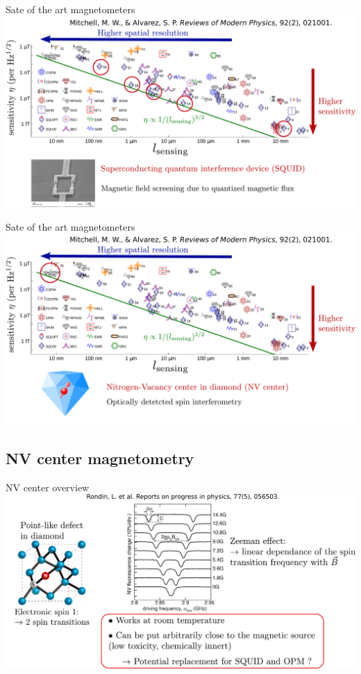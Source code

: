 \documentclass{beamer}
\begin{document}
\begin{frame}{Sate of the art magnetometers}
\centering
\includegraphics[width=\textwidth,height=0.85\textheight,keepaspectratio]{Slide_quantum_magnetometers_SQUID}
\end{frame}

\begin{frame}{Sate of the art magnetometers}
\centering
\includegraphics[width=\textwidth,height=0.85\textheight,keepaspectratio]{Slide_quantum_magnetometers_NV}
\end{frame}

\subsection{NV center magnetometry}
\begin{frame}{NV center overview}
\centering
\includegraphics[width=\textwidth,height=0.85\textheight,keepaspectratio]{Slide_NV_rapido}
\end{frame}
\end{document}
